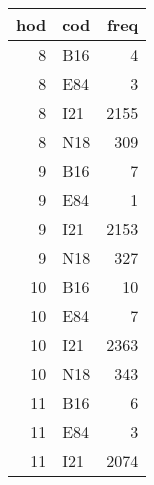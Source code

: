 \begin{tabular}{rlr}
  \toprule
 hod & cod & freq \\ 
  \midrule
    8 & B16 &   4 \\ 
    8 & E84 &   3 \\ 
    8 & I21 & 2155 \\ 
    8 & N18 & 309 \\ 
    9 & B16 &   7 \\ 
    9 & E84 &   1 \\ 
    9 & I21 & 2153 \\ 
    9 & N18 & 327 \\ 
   10 & B16 &  10 \\ 
   10 & E84 &   7 \\ 
   10 & I21 & 2363 \\ 
   10 & N18 & 343 \\ 
   11 & B16 &   6 \\ 
   11 & E84 &   3 \\ 
   11 & I21 & 2074 \\ 
   \bottomrule
\end{tabular}

